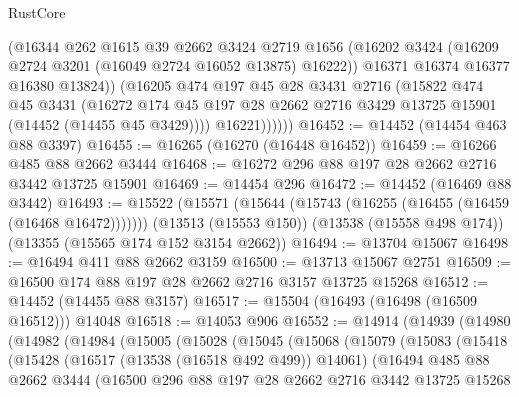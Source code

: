 \begin{lexlean}{RustCore}
\begin{coremodule}
                (@16344
                  @262
                  @1615
                  @39
                  @2662
                  @3424
                  @2719
                  @1656
                  (@16202 @3424 (@16209 @2724 @3201 (@16049 @2724 @16052 @13875) @16222))
                  @16371
                  @16374
                  @16377
                  @16380
                  @13824))
              (@16205
                @474
                @197
                @45
                @28
                @3431
                @2716
                (@15822
                  @474
                  @45
                  @3431
                  (@16272
                    @174
                    @45
                    @197
                    @28
                    @2662
                    @2716
                    @3429
                    @13725
                    @15901
                    (@14452 (@14455 @45 @3429))))
                @16221))))))
@16452 := @14452 (@14454 @463 @88 @3397)
@16455 := @16265 (@16270 (@16448 @16452))
@16459 := @16266 @485 @88 @2662 @3444
@16468 := @16272 @296 @88 @197 @28 @2662 @2716 @3442 @13725 @15901
@16469 := @14454 @296
@16472 := @14452 (@16469 @88 @3442)
@16493 := @15522
    (@15571 (@15644 (@15743 (@16255 (@16455 (@16459 (@16468 @16472)))))))
    (@13513 (@15553 @150))
    (@13538 (@15558 @498 @174))
    (@13355 (@15565 @174 @152 @3154 @2662))
@16494 := @13704 @15067
@16498 := @16494 @411 @88 @2662 @3159
@16500 := @13713 @15067 @2751
@16509 := @16500 @174 @88 @197 @28 @2662 @2716 @3157 @13725 @15268
@16512 := @14452 (@14455 @88 @3157)
@16517 := @15504 (@16493 (@16498 (@16509 @16512))) @14048
@16518 := @14053 @906
@16552 := @14914
    (@14939
      (@14980
        (@14982
          (@14984
            (@15005
              (@15028
                (@15045
                  (@15068
                    (@15079
                      (@15083
                        (@15418
                          (@15428
                            (@16517 (@13538 (@16518 @492 @499)) @14061)
                            (@16494
                              @485
                              @88
                              @2662
                              @3444
                              (@16500
                                @296
                                @88
                                @197
                                @28
                                @2662
                                @2716
                                @3442
                                @13725
                                @15268

\end{coremodule}
\end{lexlean}
